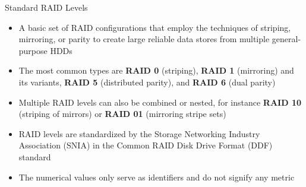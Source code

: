 \documentclass[aspectratio=169, xcolor=dvipsnames]{beamer}
\begin{document}
\begin{frame}{Standard RAID Levels}
    \begin{itemize}[<+->]
        \item A basic set of RAID configurations that employ the techniques of striping, mirroring, or parity to create large reliable data stores from multiple general-purpose HDDs
        \item The most common types are \textbf{RAID 0} (striping), \textbf{RAID 1} (mirroring) and its variants, \textbf{RAID 5} (distributed parity), and \textbf{RAID 6} (dual parity)
        \item Multiple RAID levels can also be combined or nested, for instance \textbf{RAID 10} (striping of mirrors) or \textbf{RAID 01} (mirroring stripe sets)
        \item RAID levels are standardized by the Storage Networking Industry Association (SNIA) in the Common RAID Disk Drive Format (DDF) standard
        \item The numerical values only serve as identifiers and do not signify any metric
    \end{itemize}
    \vspace{1em}
\end{frame}
\end{document}
